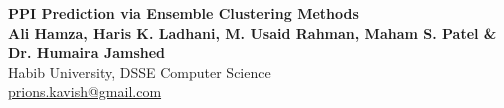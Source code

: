 \documentclass[a0, landscape]{a0poster}
\begin{document}


\begin{minipage}[b]{1\linewidth}
\veryHuge \color{NavyBlue} \textbf{PPI Prediction via Ensemble Clustering Methods} \color{Black}\\ %
\huge \textbf{Ali Hamza, Haris K. Ladhani, M. Usaid Rahman, Maham S. Patel \& Dr. Humaira Jamshed}\\ %
\huge Habib University, DSSE Computer Science\\ %
\Large \href{mailto:prions.kavish@gmail.com}{prions.kavish@gmail.com}\\ %

\end{minipage}
%
%
\vspace{1cm} %

\end{document}
